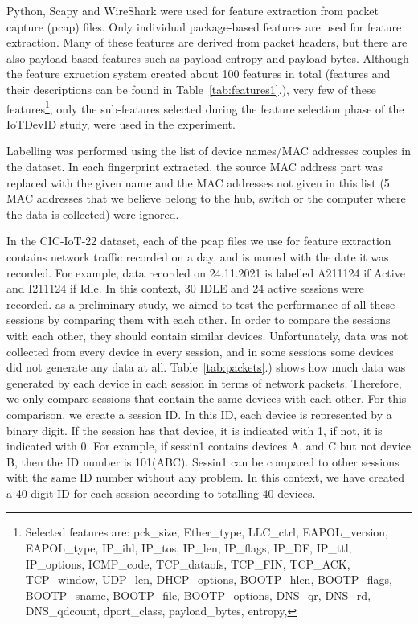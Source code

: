\documentclass[journal]{IEEEtran}
\begin{document}
Python, Scapy and WireShark were used for feature extraction from  packet capture (pcap) files. Only individual package-based features are used for feature extraction. Many of these features are derived from packet headers, but there are also payload-based features such as payload entropy and payload bytes. Although the feature exruction system created about 100 features in total (features and their descriptions can be found in Table~\ref{tab:features1}.), very few of these features\footnote{Selected features are: pck\_size, Ether\_type, LLC\_ctrl, EAPOL\_version, EAPOL\_type, IP\_ihl, IP\_tos, IP\_len, IP\_flags, IP\_DF, IP\_ttl, IP\_options, ICMP\_code, TCP\_dataofs, TCP\_FIN, TCP\_ACK, TCP\_window, UDP\_len, DHCP\_options, BOOTP\_hlen, BOOTP\_flags, BOOTP\_sname, BOOTP\_file, BOOTP\_options, DNS\_qr, DNS\_rd, DNS\_qdcount, dport\_class, payload\_bytes, entropy,}, only the sub-features selected during the feature selection phase of the IoTDevID study, were used in the experiment.

Labelling was performed using the list of device names/MAC addresses couples in the dataset. In each fingerprint extracted, the source MAC address part was replaced with the given name and the MAC addresses not given in this list (5 MAC addresses that we believe belong to the hub, switch or the computer where the data is collected) were ignored.


In the CIC-IoT-22 dataset, each of the pcap files we use for feature extraction contains network traffic recorded on a day, and is named with the date it was recorded.   For example, data recorded on 24.11.2021 is labelled A211124 if Active and I211124 if Idle. In this context, 30 IDLE and 24 active sessions were recorded. as a preliminary study, we aimed to test the performance of all these sessions by comparing them with each other. In order to compare the sessions with each other, they should contain similar devices. Unfortunately, data was not collected from every device in every session, and in some sessions some devices did not generate any data at all. Table~\ref{tab:packets}.) shows how much data was generated by each device in each session in terms of network packets. Therefore, we only compare sessions that contain the same devices with each other. For this comparison, we create a session ID. In this ID, each device is represented by a binary digit. If the session has that device, it is indicated with 1, if not, it is indicated with 0. For example, if sessin1 contains devices A, and C but not device B, then the ID number is 101(ABC). Sessin1 can be compared to other sessions with the same ID number without any problem. In this context, we have created a 40-digit ID for each session according to totalling 40 devices.
\end{document}
